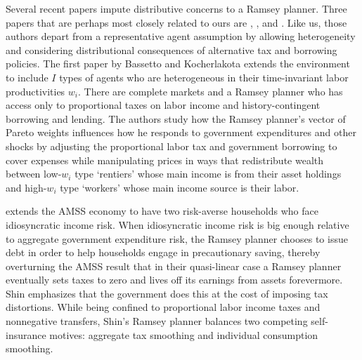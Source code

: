 \documentclass[thmsb,11pt]{article}
\begin{document}
Several recent papers impute distributive concerns to a Ramsey planner.
Three papers that are perhaps most closely related to ours are \citet{Bassetto2004}, \citet{shin2006ramsey}, and \citet{Wer07a}. Like us, those authors depart from
a representative agent assumption by allowing heterogeneity and considering
distributional consequences of alternative tax and borrowing policies.
The first paper by Bassetto and Kocherlakota  extends the \citet{LucasJr.1983} environment to include $I$ types of
agents who are heterogeneous in their time-invariant labor productivities $%
w_{i}$. There are complete markets and a Ramsey planner who has access only
to proportional taxes on labor income and history-contingent borrowing and
lending. The authors study how the Ramsey planner's vector of Pareto weights
influences how he responds to government expenditures and other shocks by
adjusting the proportional labor tax and government borrowing to cover
expenses while manipulating prices in ways that redistribute wealth between
low-$w_{i}$ type `rentiers' whose main income is from their asset holdings
and high-$w_{i}$ type `workers' whose main income source is their labor.

\citet{shin2006ramsey} extends the AMSS economy to have two risk-averse households who
face idiosyncratic income risk. When idiosyncratic income risk is big enough
relative to aggregate government expenditure risk, the Ramsey planner
chooses to issue debt in order to help households engage in precautionary
saving, thereby overturning the AMSS result that  in their quasi-linear case a
 Ramsey planner  eventually sets taxes to zero and lives off its earnings from assets forevermore.
  Shin emphasizes that the
government does this at the cost of imposing tax distortions. While being
confined to proportional labor income taxes and nonnegative
transfers, Shin's Ramsey planner balances two competing self-insurance
motives: aggregate tax smoothing and individual consumption smoothing.
\end{document}

